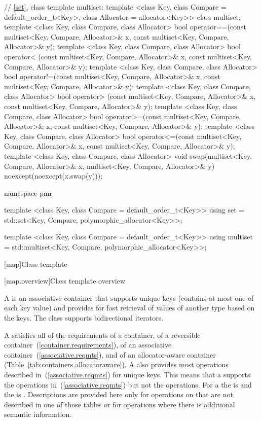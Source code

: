 \begin{codeblock}
{  // \ref{set}, class template multiset:
  template <class Key, class Compare = default_order_t<Key>,
            class Allocator = allocator<Key>>
    class multiset;
  template <class Key, class Compare, class Allocator>
    bool operator==(const multiset<Key, Compare, Allocator>& x,
                    const multiset<Key, Compare, Allocator>& y);
  template <class Key, class Compare, class Allocator>
    bool operator< (const multiset<Key, Compare, Allocator>& x,
                    const multiset<Key, Compare, Allocator>& y);
  template <class Key, class Compare, class Allocator>
    bool operator!=(const multiset<Key, Compare, Allocator>& x,
                    const multiset<Key, Compare, Allocator>& y);
  template <class Key, class Compare, class Allocator>
    bool operator> (const multiset<Key, Compare, Allocator>& x,
                    const multiset<Key, Compare, Allocator>& y);
  template <class Key, class Compare, class Allocator>
    bool operator>=(const multiset<Key, Compare, Allocator>& x,
                    const multiset<Key, Compare, Allocator>& y);
  template <class Key, class Compare, class Allocator>
    bool operator<=(const multiset<Key, Compare, Allocator>& x,
                    const multiset<Key, Compare, Allocator>& y);
  template <class Key, class Compare, class Allocator>
    void swap(multiset<Key, Compare, Allocator>& x,
              multiset<Key, Compare, Allocator>& y)
      noexcept(noexcept(x.swap(y)));

  namespace pmr {
    template <class Key, class Compare = default_order_t<Key>>
      using set = std::set<Key, Compare,
                           polymorphic_allocator<Key>>;

    template <class Key, class Compare = default_order_t<Key>>
      using multiset = std::multiset<Key, Compare,
                                     polymorphic_allocator<Key>>;
  }
}
\end{codeblock}

[map]{Class template }

[map.overview]{Class template  overview}

%
\pnum
A  is an associative container that
supports unique keys (contains at most one of each key value) and
provides for fast retrieval of values of another type  based
on the keys. The  class supports bidirectional iterators.

\pnum
A
satisfies all of the requirements of a container, of a reversible container~(\ref{container.requirements}), of
an associative container~(\ref{associative.reqmts}), and of an allocator-aware container (Table~\ref{tab:containers.allocatoraware}).
A
also provides most operations described in~(\ref{associative.reqmts})
for unique keys.
This means that a
supports the
operations in~(\ref{associative.reqmts})
but not the
operations.
For a
the
is
and the
is
.
Descriptions are provided here only for operations on
that are not described in one of those tables
or for operations where there is additional semantic information.

